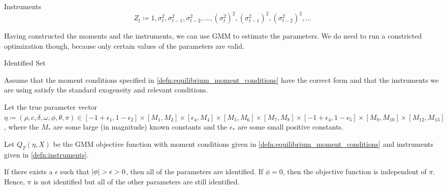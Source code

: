 \documentclass[11pt, letterpaper, twoside, final]{article}
\begin{document}
\begin{defn}{Instruments}
    \label{defn:instruments}
    \begin{equation}
        Z_t \coloneqq 1, \sigma^2_{t}, \sigma^2_{t-1}, \sigma^2_{t-2}, \ldots, (\sigma^2_{t})^2,
        (\sigma^2_{t-1})^2, (\sigma^2_{t-2})^2, \ldots
    \end{equation}
\end{defn}

Having constructed the moments and the instruments, we can use GMM to estimate the parameters.
We do need to run a constricted optimization though, because only certain values of the parameters are valid. 

\begin{lemma}{Identified Set}
    
    Assume that the moment conditions specified in \cref{defn:equilibrium_moment_conditions} have the correct form
    and that the instruments we are using satisfy the standard exogeneity and relevant conditions. 

    Let the true parameter vector $\eta \coloneqq (\rho, c, \delta, \omega, \phi, \theta, \pi) \in [-1+\epsilon_1,
    1 - \epsilon_2] \times [M_1, M_2] \times [\epsilon_4, M_4]\times [M_5, M_6]\times [M_7, M_8] \times [-1 +
    \epsilon_4, 1 - \epsilon_5] \times [M_9, M_10] \times [M_12, M_13]$, where the $M_{\ast}$ are some large (in
    magnitude) known constants and the $\epsilon_{\ast}$ are some small positive constants.  

    Let $Q_T(\eta, X)$  be the GMM objective function with moment conditions given in
    \cref{defn:equilibrium_moment_conditions} and instruments given in  \cref{defn:instruments}.

    If there exists a $\epsilon$ such that $\lvert\phi\rvert > \epsilon > 0$, then all of the parameters are identified. 
    If $\phi = 0$, then the objective function is independent of $\pi$. 
    Hence, $\pi$ is not identified but all of the other parameters are still identified.

\end{lemma}
\end{document}
